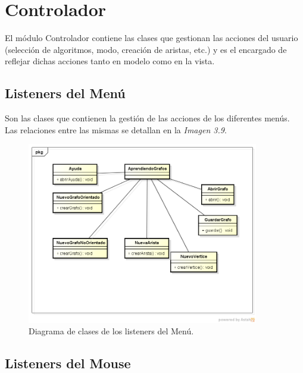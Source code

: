 \documentclass{book}
\begin{document}
\section{Controlador}

El módulo Controlador contiene las clases que gestionan las acciones del usuario (selección de algoritmos, modo, creación de aristas, etc.) y es el encargado de reflejar dichas acciones tanto en modelo como en la vista.

\subsection{Listeners del Menú}

Son las clases que contienen la gestión de las acciones de los diferentes menús.
Las relaciones entre las mismas se detallan en la \textit{Imagen 3.9}.
\begin{figure}[H]
	\centering
	\includegraphics[width=0.9\textwidth]{images/menu.png}
	\medskip
	\caption{Diagrama de clases de los listeners del Menú.}
	\medskip
\end{figure}
\bigskip

\subsection{Listeners del Mouse}
\end{document}
